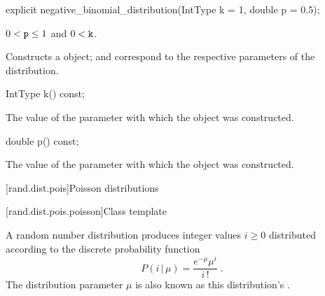 %
\begin{itemdecl}
explicit negative_binomial_distribution(IntType k = 1, double p = 0.5);
\end{itemdecl}

\begin{itemdescr}
\pnum\requires
 $0 < \texttt{\protect p} \leq 1$
 and $0 < \texttt{\protect k} $.

\pnum\effects Constructs a  object;
  and 
 correspond to the respective parameters of the distribution.
\end{itemdescr}

%
\begin{itemdecl}
IntType k() const;
\end{itemdecl}

\begin{itemdescr}
\pnum\returns The value of the  parameter
 with which the object was constructed.
\end{itemdescr}

%
\begin{itemdecl}
double p() const;
\end{itemdecl}

\begin{itemdescr}
\pnum\returns The value of the  parameter
 with which the object was constructed.
\end{itemdescr}%
%
%



[rand.dist.pois]{Poisson distributions}%
%
%


[rand.dist.pois.poisson]{Class template }%
%
%

\pnum
A  random number distribution
produces integer values $ i \geq 0 $
distributed according to
the discrete probability function
%
%
\[%
 P(i\,|\,\mu)
      = \frac{ e^{-\mu} \mu^{i} }
             { i\,! }
\; \mbox{.}
\]
The distribution parameter $\mu$
is also known as this distribution's %
%
%
.

